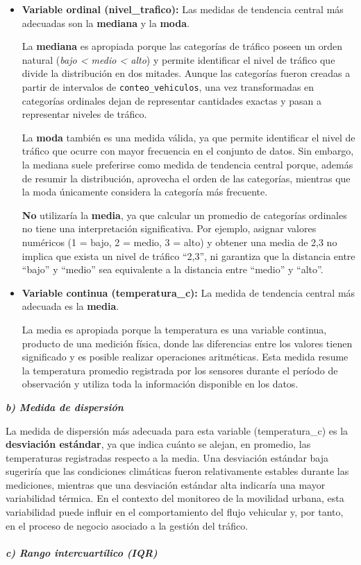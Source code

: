 \documentclass[11pt]{article}
\begin{document}
\begin{itemize}
    \item \textbf{Variable ordinal (nivel\_trafico):} Las medidas de tendencia central más adecuadas son la \textbf{mediana} y la \textbf{moda}.

    La \textbf{mediana} es apropiada porque las categorías de tráfico poseen un orden natural (\textit{bajo < medio < alto}) y permite identificar el nivel de tráfico que divide la distribución en dos mitades. Aunque las categorías fueron creadas a partir de intervalos de \texttt{conteo\_vehiculos}, una vez transformadas en categorías ordinales dejan de representar cantidades exactas y pasan a representar niveles de tráfico.
    
    La \textbf{moda} también es una medida válida, ya que permite identificar el nivel de tráfico que ocurre con mayor frecuencia en el conjunto de datos. Sin embargo, la mediana suele preferirse como medida de tendencia central porque, además de resumir la distribución, aprovecha el orden de las categorías, mientras que la moda únicamente considera la categoría más frecuente.
    
    \textbf{No} utilizaría la \textbf{media}, ya que calcular un promedio de categorías ordinales no tiene una interpretación significativa. Por ejemplo, asignar valores numéricos (1 = bajo, 2 = medio, 3 = alto) y obtener una media de 2,3 no implica que exista un nivel de tráfico ``2,3'', ni garantiza que la distancia entre ``bajo'' y ``medio'' sea equivalente a la distancia entre ``medio'' y ``alto''.

    \item \textbf{Variable continua (temperatura\_c):} La medida de tendencia central más adecuada es la \textbf{media}.
    
    La media es apropiada porque la temperatura es una variable continua, producto de una medición física, donde las diferencias entre los valores tienen significado y es posible realizar operaciones aritméticas. Esta medida resume la temperatura promedio registrada por los sensores durante el período de observación y utiliza toda la información disponible en los datos.
\end{itemize}
\textit{\textbf{b) Medida de dispersión}}

La medida de dispersión más adecuada para esta variable (temperatura\_c) es la \textbf{desviación estándar}, ya que indica cuánto se alejan, en promedio, las temperaturas registradas respecto a la media. Una desviación estándar baja sugeriría que las condiciones climáticas fueron relativamente estables durante las mediciones, mientras que una desviación estándar alta indicaría una mayor variabilidad térmica. En el contexto del monitoreo de la movilidad urbana, esta variabilidad puede influir en el comportamiento del flujo vehicular y, por tanto, en el proceso de negocio asociado a la gestión del tráfico.\\ \\
\textit{\textbf{c) Rango intercuartílico (IQR)}}
\end{document}
